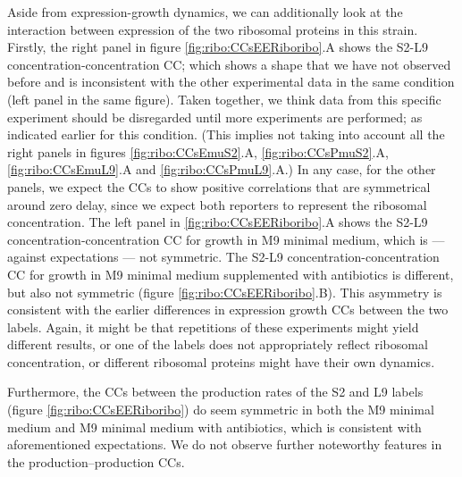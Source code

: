 Aside from expression-growth dynamics, we can additionally look at the interaction between expression of the two ribosomal proteins in this strain. 
% 
Firstly, the right panel in figure \ref{fig:ribo:CCsEERiboribo}.A shows the S2-L9 concentration-concentration CC; which shows a shape that we have not observed before and is inconsistent with the other experimental data in the same condition (left panel in the same figure). 
Taken together, we think data from this specific experiment should be disregarded until more experiments are performed; as indicated earlier for this condition.
(This implies not taking into account all the right panels in figures \ref{fig:ribo:CCsEmuS2}.A, \ref{fig:ribo:CCsPmuS2}.A, \ref{fig:ribo:CCsEmuL9}.A and \ref{fig:ribo:CCsPmuL9}.A.)
%
In any case, for the other panels, we expect the CCs to show positive correlations that are symmetrical around zero delay, since we expect both reporters to represent the ribosomal concentration.
%
The left panel in \ref{fig:ribo:CCsEERiboribo}.A shows the S2-L9 concentration-concentration CC for growth in M9 minimal medium, which is --- against expectations --- not symmetric.
The S2-L9 concentration-concentration CC for growth in M9 minimal medium supplemented with antibiotics is different, but also not symmetric (figure \ref{fig:ribo:CCsEERiboribo}.B).
%
This asymmetry is consistent with the earlier differences in expression growth CCs between the two labels.
Again, it might be that 
repetitions of these experiments might yield different results, or one of the labels does not appropriately reflect ribosomal concentration, or different ribosomal proteins might have their own dynamics.



Furthermore, the CCs between the production rates of the S2 and L9 labels (figure \ref{fig:ribo:CCsEERiboribo}) do seem symmetric in both the M9 minimal medium and M9 minimal medium with antibiotics, which is consistent with aforementioned expectations.
We do not observe further noteworthy features in the production--production CCs.




